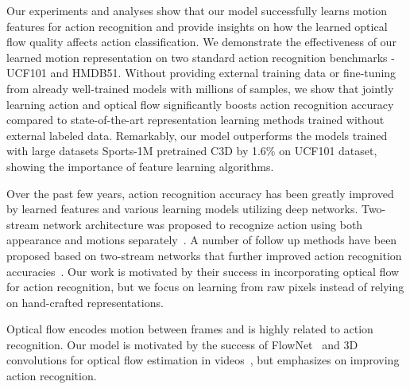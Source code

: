 \documentclass[10pt,twocolumn,letterpaper]{article}
\begin{document}
Our experiments and analyses show that our model successfully learns motion features for action recognition and provide insights on how the learned optical flow quality affects action classification.
We demonstrate the effectiveness of our learned motion representation on two standard action recognition benchmarks - UCF101 and HMDB51.
Without providing external training data or fine-tuning from already well-trained models with millions of samples, we show that jointly learning action and optical flow significantly boosts action recognition accuracy compared to state-of-the-art representation learning methods trained without external labeled data.
Remarkably, our model outperforms the models trained with large datasets Sports-1M pretrained C3D by 1.6\% on UCF101 dataset, showing the importance of feature learning algorithms.

Over the past few years, action recognition accuracy has been greatly improved by learned features and various learning models utilizing deep networks.
Two-stream network architecture was proposed to recognize action using both appearance and motions separately~\cite{simonyanZ14a}.
A number of follow up methods have been proposed based on two-stream networks that further improved action recognition accuracies~\cite{feichtenhofer2016convolutional,wang2016actions,wangXWQLTV16,feichtenhofer2016spatiotemporal,ng2018tdn}.
Our work is motivated by their success in incorporating optical flow for action recognition, but we focus on learning from raw pixels instead of relying on hand-crafted representations.

Optical flow encodes motion between frames and is highly related to action recognition.
Our model is motivated by the success of FlowNet~\cite{FischerDIHHGSCB15} and 3D convolutions for optical flow estimation in videos~\cite{tranbftp16}, but emphasizes on improving action recognition.
\end{document}
